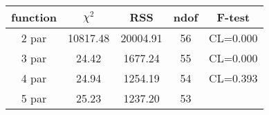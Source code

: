 \begin{tabular}{c|c|c|c|c}
function & $\chi^2$ & RSS & ndof & F-test \\
\hline
2 par & 10817.48 & 20004.91 & 56 & CL=0.000 \\
3 par & 24.42 & 1677.24 & 55 & CL=0.000 \\
4 par & 24.94 & 1254.19 & 54 & CL=0.393 \\
5 par & 25.23 & 1237.20 & 53 & \\
\hline
\end{tabular}